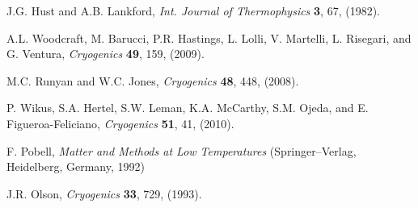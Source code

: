\documentclass[final]{svjour2}
\begin{document}
\begin{thebibliography}{99}

J.G. Hust and A.B. Lankford, {\it Int. Journal of Thermophysics} \textbf{3}, 67, (1982).

A.L. Woodcraft, M. Barucci, P.R. Hastings, L. Lolli, V. Martelli, L. Risegari, and G. Ventura, {\it Cryogenics} \textbf{49}, 159, (2009).

M.C. Runyan and W.C. Jones, {\it Cryogenics} \textbf{48}, 448, (2008).

P. Wikus, S.A. Hertel, S.W. Leman, K.A. Mc{C}arthy, S.M. Ojeda, and E. Figueroa-{F}eliciano, {\it Cryogenics} \textbf{51}, 41, (2010).

F. Pobell, {\it Matter and Methods at Low Temperatures} (Springer--Verlag, Heidelberg, Germany, 1992)

J.R. Olson, {\it Cryogenics} \textbf{33}, 729, (1993).

\end{thebibliography}
\end{document}
